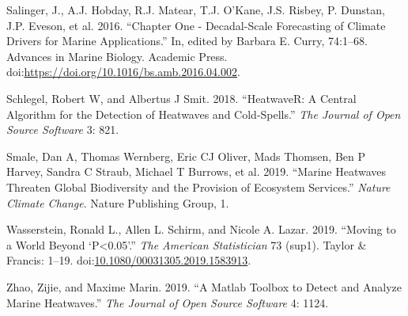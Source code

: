 \documentclass[]{article}
\begin{document}
\hypertarget{ref-Salinger2016}{}
Salinger, J., A.J. Hobday, R.J. Matear, T.J. O'Kane, J.S. Risbey, P.
Dunstan, J.P. Eveson, et al. 2016. ``Chapter One - Decadal-Scale
Forecasting of Climate Drivers for Marine Applications.'' In, edited by
Barbara E. Curry, 74:1--68. Advances in Marine Biology. Academic Press.
doi:\href{https://doi.org/https://doi.org/10.1016/bs.amb.2016.04.002}{https://doi.org/10.1016/bs.amb.2016.04.002}.

\hypertarget{ref-Schlegel2018}{}
Schlegel, Robert W, and Albertus J Smit. 2018. ``HeatwaveR: A Central
Algorithm for the Detection of Heatwaves and Cold-Spells.'' \emph{The
Journal of Open Source Software} 3: 821.

\hypertarget{ref-Smale2019}{}
Smale, Dan A, Thomas Wernberg, Eric CJ Oliver, Mads Thomsen, Ben P
Harvey, Sandra C Straub, Michael T Burrows, et al. 2019. ``Marine
Heatwaves Threaten Global Biodiversity and the Provision of Ecosystem
Services.'' \emph{Nature Climate Change}. Nature Publishing Group, 1.

\hypertarget{ref-Wasserstein2019}{}
Wasserstein, Ronald L., Allen L. Schirm, and Nicole A. Lazar. 2019.
``Moving to a World Beyond `P\textless{}0.05'.'' \emph{The American
Statistician} 73 (sup1). Taylor \& Francis: 1--19.
doi:\href{https://doi.org/10.1080/00031305.2019.1583913}{10.1080/00031305.2019.1583913}.

\hypertarget{ref-Zhao2019}{}
Zhao, Zijie, and Maxime Marin. 2019. ``A Matlab Toolbox to Detect and
Analyze Marine Heatwaves.'' \emph{The Journal of Open Source Software}
4: 1124.
\end{document}

